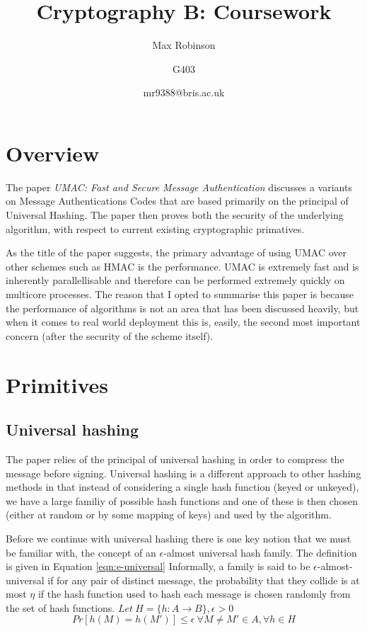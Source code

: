 \documentclass[11pt]{article} %
\title{Cryptography B: Coursework}
\author{Max Robinson \and G403 \and mr9388@bris.ac.uk}
\begin{document}
\maketitle 
\section{Overview}

The paper \emph{UMAC: Fast and Secure Message Authentication} discusses a
variants on Message Authentications Codes that are based primarily on the
principal of Universal Hashing. The paper then proves both the security of the
underlying algorithm, with respect to current existing cryptographic
primatives.

As the title of the paper suggests, the primary advantage of using UMAC over
other schemes such as HMAC is the performance. UMAC is extremely fast and is
inherently parallellisable and therefore can be performed extremely quickly on
 multicore processes. The reason that I opted to summarise this paper is
 because the performance of algorithms is not an area that has been discussed
 heavily, but when it comes to real world deployment this is, easily, the
 second most important concern (after the security of the scheme itself).

 \section{Primitives}

 \subsection{Universal hashing}

 The paper relies of the principal of universal hashing in order to compress
 the message before signing. Universal hashing is a different approach to
 other hashing methods in that instead of considering a single hash function
 (keyed or unkeyed), we have a large familiy of possible hash functions and
 one of these is then chosen (either at random or by some mapping of keys) and
 used by the algorithm.

 Before we continue with universal hashing there is one key notion that we
 must be familiar with, the concept of an $\epsilon$-almost universal hash family.
 The definition is given in Equation \ref{eqn:e-universal}
 Informally, a family is said to be $\epsilon$-almost-universal if for any pair
 of  distinct message, the probability that they collide is at most $\eta$ if the
 hash function used to hash each message is chosen randomly from the set of
 hash functions.
$Let\ H = \{h: A \rightarrow B\}, \epsilon > 0$
\begin{equation}
 Pr[h(M) = h(M')] \leq \epsilon\ \forall M \neq M' \in A,\forall h \in H
\label{eqn:e-universal}
\end{equation}
\end{document}
